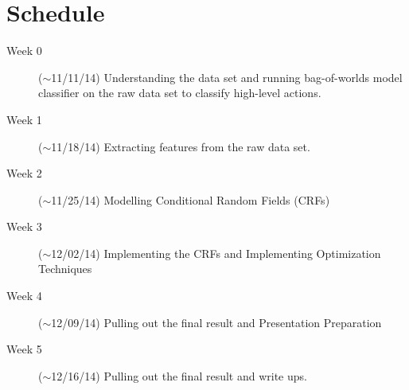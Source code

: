 \documentclass{article} %
\begin{document}
\section{Schedule}
\begin{description}
\item[Week 0] ($\sim$11/11/14) Understanding the data set and running bag-of-worlds model classifier on the raw data set to classify high-level actions.
\item[Week 1] ($\sim$11/18/14) Extracting features from the raw data set.
\item[Week 2] ($\sim$11/25/14) Modelling Conditional Random Fields (CRFs) 
\item[Week 3] ($\sim$12/02/14) Implementing the CRFs and Implementing Optimization Techniques
\item[Week 4] ($\sim$12/09/14) Pulling out the final result and Presentation Preparation
\item[Week 5] ($\sim$12/16/14) Pulling out the final result and write ups.
\end{description}


\end{document}
